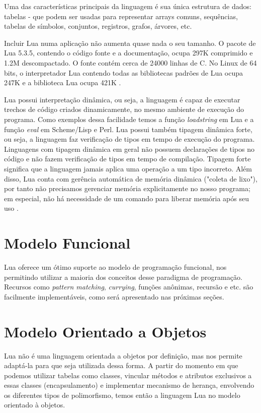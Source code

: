 \documentclass[rel_mlp]{iiufrgs}
\begin{document}
Uma das características principais da linguagem é sua única estrutura de dados: tabelas - que podem ser usadas para representar arrays comuns, sequências, tabelas de símbolos, conjuntos, registros, grafos, árvores, etc.

Incluir Lua numa aplicação não aumenta quase nada o seu tamanho. O pacote de Lua 5.3.5, contendo o código fonte e a documentação, ocupa 297K comprimido e 1.2M descompactado. O fonte contém cerca de 24000 linhas de C. No Linux de 64 bits, o interpretador Lua contendo todas as bibliotecas padrões de Lua ocupa 247K e a biblioteca Lua ocupa 421K \cite{AboutLua}.

Lua possui interpretação dinâmica, ou seja, a linguagem é capaz de executar trechos de código criados dinamicamente, no mesmo ambiente de execução do programa. Como exemplos dessa facilidade temos a função \textit{loadstring} em Lua e a função \textit{eval} em Scheme/Lisp e Perl. Lua possui também tipagem dinâmica forte, ou seja, a linguagem faz verificação de tipos em tempo de execução do programa. Linguagens com
tipagem dinâmica em geral não possuem declarações de tipos no código e não fazem verificação de tipos em tempo de compilação. Tipagem forte significa que a linguagem jamais aplica uma operação a um tipo incorreto. Além disso, Lua conta com gerência automática de memória dinâmica ("coleta de lixo"), por tanto não precisamos gerenciar memória explicitamente no nosso programa; em especial, não há necessidade de um comando para liberar memória após seu uso \cite{IntroLuaPDF}.

\section{Modelo Funcional}

Lua oferece um ótimo suporte ao modelo de programação funcional, nos permitindo utilizar a maioria dos conceitos desse paradigma de programação. Recursos como \textit{pattern matching}, \textit{currying}, funções anônimas, recursão e etc. são facilmente implementáveis, como será apresentado nas próximas seções. \cite{ManualLua}

\section{Modelo Orientado a Objetos}

Lua não é uma linguagem orientada a objetos por definição, mas nos permite adaptá-la para que seja utilizada dessa forma. A partir do momento em que podemos utilizar tabelas como classes, vincular métodos e atributos exclusivos a essas classes (encapsulamento) e implementar mecanismo de herança, envolvendo os diferentes tipos de polimorfismo, temos então a linguagem Lua no modelo orientado à objetos.
\end{document}

